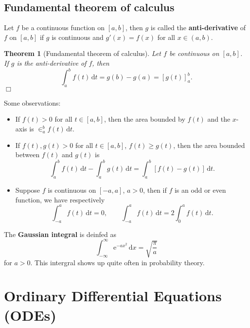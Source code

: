 \documentclass[letter-paper]{tufte-book}
\newtheorem{theorem}{\color{pastel-blue}Theorem}[section]
\newcommand{\ex}{\mathrm{e}}
\newcommand\Def[1]{\textbf{#1}}
\newcommand{\qedwhite}{\hfill \ensuremath{\Box}}
\begin{document}

\section{Fundamental theorem of calculus}

Let $f$ be a continuous function on $[a,b]$, then $g$ is called the
\Def{anti-derivative} of $f$ on $[a,b]$ if $g$ is continuous and
$g'(x)=f(x)$ for all $x\in(a,b)$.
\begin{theorem}[Fundamental theorem of calculus]
  Let $f$ be continuous on $[a,b]$. If $g$ is the anti-derivative of $f$, then
  \begin{equation*}
    \int_a^b f(t)\, \mathrm{d}t=g(b)-g(a)=\left[g(t)\right]_a^b.
  \end{equation*}
  \qedwhite
\end{theorem}
Some observations:
\begin{itemize}
  \item If $f(t)>0$ for all $t\in[a,b]$, then the area bounded by $f(t)$ and the
  $x$-axis is $\in_a^b f(t)\, \mathrm{d}t$.
  
  \item If $f(t),g(t)>0$ for all $t\in[a,b]$, $f(t)\geq g(t)$, then the area
  bounded between $f(t)$ and $g(t)$ is
  \begin{equation*}
    \int_a^b f(t)\, \mathrm{d}t-\int_a^b g(t)\, \mathrm{d}t=
    \int_a^b[f(t)-g(t)]\, \mathrm{d}t.
  \end{equation*}
  
  \item Suppose $f$ is continuous on $[-a,a]$, $a>0$, then if $f$ is an odd
  or even function, we have respectively
  \begin{equation*}
    \int_{-a}^a f(t)\, \mathrm{d}t=0,\qquad \int_{-a}^a f(t)\, \mathrm{d}t
    =2\int_0^a f(t)\, \mathrm{d}t.
  \end{equation*}
\end{itemize}

The \Def{Gaussian integral} is deinfed as
\begin{equation*}
  \int_{-\infty}^\infty \ex^{-ax^2}\, \mathrm{d}x=\sqrt{\frac{\pi}{a}}
\end{equation*}
for $a>0$. This intergral shows up quite often in probability theory.


\chapter{Ordinary Differential Equations (ODEs)}
\end{document}
